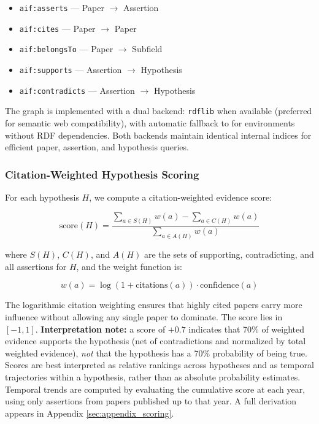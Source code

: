 \documentclass[
  english,
]{article}
\providecommand{\tightlist}{%
  \setlength{\itemsep}{0pt}\setlength{\parskip}{0pt}}
\begin{document}
\begin{itemize}
\tightlist
\item
  \texttt{aif:asserts} --- Paper \(\to\) Assertion
\item
  \texttt{aif:cites} --- Paper \(\to\) Paper
\item
  \texttt{aif:belongsTo} --- Paper \(\to\) Subfield
\item
  \texttt{aif:supports} --- Assertion \(\to\) Hypothesis
\item
  \texttt{aif:contradicts} --- Assertion \(\to\) Hypothesis
\end{itemize}

The graph is implemented with a dual backend: \texttt{rdflib}
\citep{rdflib2023} when available (preferred for semantic web
compatibility), with automatic fallback to  for
environments without RDF dependencies. Both backends maintain identical
internal indices for efficient paper, assertion, and hypothesis queries.

\subsubsection{Citation-Weighted Hypothesis
Scoring}\label{citation-weighted-hypothesis-scoring}

For each hypothesis \(H\), we compute a citation-weighted evidence
score:

\begin{equation}
\text{score}(H) = \frac{\sum_{a \in S(H)} w(a) - \sum_{a \in C(H)} w(a)}{\sum_{a \in A(H)} w(a)} \label{eq:score}
\end{equation}

where \(S(H)\), \(C(H)\), and \(A(H)\) are the sets of supporting,
contradicting, and all assertions for \(H\), and the weight function is:

\begin{equation}
w(a) = \log(1 + \text{citations}(a)) \cdot \text{confidence}(a) \label{eq:weight}
\end{equation}

The logarithmic citation weighting ensures that highly cited papers
carry more influence without allowing any single paper to dominate. The
score lies in \([-1, 1]\). \textbf{Interpretation note:} a score of
\(+0.7\) indicates that 70\% of weighted evidence supports the
hypothesis (net of contradictions and normalized by total weighted
evidence), \emph{not} that the hypothesis has a 70\% probability of
being true. Scores are best interpreted as relative rankings across
hypotheses and as temporal trajectories within a hypothesis, rather than
as absolute probability estimates. Temporal trends are computed by
evaluating the cumulative score at each year, using only assertions from
papers published up to that year. A full derivation appears in Appendix
\ref{sec:appendix_scoring}.
\end{document}
